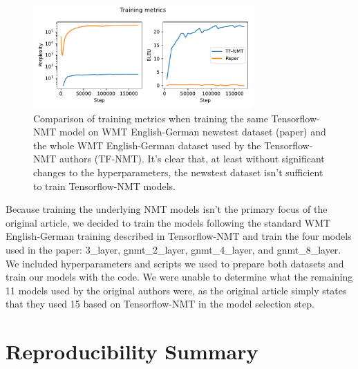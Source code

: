\begin{figure}
    \centering
    \includegraphics[width=0.75\textwidth]{report/figures/tf-nmt_paper_training.pdf}
    \caption{Comparison of training metrics when training the same Tensorflow-NMT model on WMT English-German newstest dataset (paper) and the whole WMT English-German dataset used by the Tensorflow-NMT authors (TF-NMT). It's clear that, at least without significant changes to the hyperparameters, the newstest dataset isn't sufficient to train Tensorflow-NMT models.}
    \label{fig:tf-nmt_paper_training}
\end{figure}

Because training the underlying NMT models isn't the primary focus of the original article, we decided to train the models following the standard WMT English-German training described in Tensorflow-NMT and train the four models used in the paper: 3\_layer, gnmt\_2\_layer, gnmt\_4\_layer, and gnmt\_8\_layer. We included hyperparameters and scripts we used to prepare both datasets and train our models with the code. We were unable to determine what the remaining 11 models used by the original authors were, as the original article simply states that they used 15  based on Tensorflow-NMT in the model selection step.



\section*{Reproducibility Summary}


